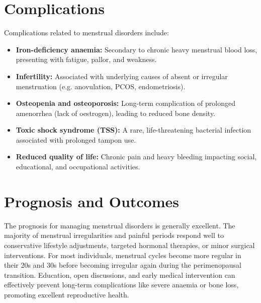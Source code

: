 \section*{Complications}
Complications related to menstrual disorders include:
\begin{itemize}
    \item \textbf{Iron-deficiency anaemia:} Secondary to chronic heavy menstrual blood loss, presenting with fatigue, pallor, and weakness.
    \item \textbf{Infertility:} Associated with underlying causes of absent or irregular menstruation (e.g. anovulation, PCOS, endometriosis).
    \item \textbf{Osteopenia and osteoporosis:} Long-term complication of prolonged amenorrhea (lack of oestrogen), leading to reduced bone density.
    \item \textbf{Toxic shock syndrome (TSS):} A rare, life-threatening bacterial infection associated with prolonged tampon use.
    \item \textbf{Reduced quality of life:} Chronic pain and heavy bleeding impacting social, educational, and occupational activities.
\end{itemize}

\section*{Prognosis and Outcomes}
The prognosis for managing menstrual disorders is generally excellent. The majority of menstrual irregularities and painful periods respond well to conservative lifestyle adjustments, targeted hormonal therapies, or minor surgical interventions. For most individuals, menstrual cycles become more regular in their 20s and 30s before becoming irregular again during the perimenopausal transition. Education, open discussions, and early medical intervention can effectively prevent long-term complications like severe anaemia or bone loss, promoting excellent reproductive health.

